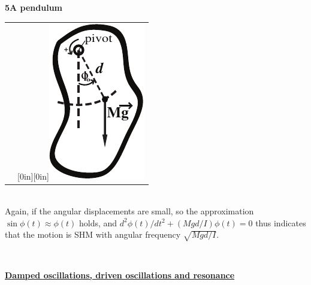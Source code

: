 \documentclass[a4paper,12pt,oneside]{report}
\newenvironment{tree}[4]{
\begin{list}{#1}{\parskip=0in \topsep=0in \itemsep=0in \parsep=0in \partopsep=0in \leftmargin=#2 \rightmargin=#3 \itemindent=#4 \listparindent=\itemindent}
}{\end{list}}
\newenvironment{ssection}[5]{
\phantom{#1}\textbf{#2\space#3}
\begin{tree}{#4}{0in}{0in}{#5}
}{\end{tree}}
\begin{document}
\begin{ssection}{\space}{5}{A pendulum}{\textbullet}{\parindent}
\begin{tabular}{p{}p{}}
&\raisebox{-96pt}[0in][0in]{\includegraphics[scale=1.1]{figures/14Dec2.pdf}}
\end{tabular}\\
Again, if the angular displacements are small, so the approximation $\sin\phi(t)\approx\phi(t)$ holds, and $d^{2}\phi(t)/dt^{2}+(Mgd/I)\phi(t)=0$ thus indicates that the motion is SHM with angular frequency $\sqrt{Mgd/I}$.
\end{ssection}\ \par\noindent
{} \textbf{\underline{Damped oscillations, driven oscillations and resonance}} \\
\end{document}
